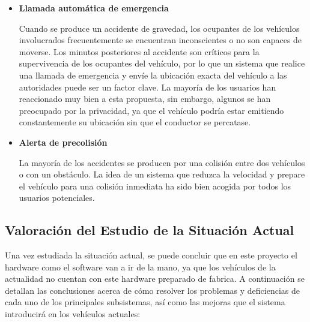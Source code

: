 \begin{itemize}[-]
\item \textbf{Llamada automática de emergencia}
\par Cuando se produce un accidente de gravedad, los ocupantes de los vehículos involucrados frecuentemente se encuentran inconscientes o no son capaces de moverse. Los minutos posteriores al accidente son críticos para la supervivencia de los ocupantes del vehículo, por lo que un sistema que realice una llamada de emergencia y envíe la ubicación exacta del vehículo a las autoridades puede ser un factor clave. La mayoría de los usuarios han reaccionado muy bien a esta propuesta, sin embargo, algunos se han preocupado por la privacidad, ya que el vehículo podría estar emitiendo constantemente su ubicación sin que el conductor se percatase.

\item \textbf{Alerta de precolisión}
\par La mayoría de los accidentes se producen por una colisión entre dos vehículos o con un obstáculo. La idea de un sistema que reduzca la velocidad y prepare el vehículo para una colisión inmediata ha sido bien acogida por todos los usuarios potenciales.


\end{itemize}

\subsection{Valoración del Estudio de la Situación Actual}
\par Una vez estudiada la situación actual, se puede concluir que en este proyecto el hardware como el software van a ir de la mano, ya que los vehículos de la actualidad no cuentan con este hardware preparado de fabrica. A continuación se detallan las conclusiones acerca de cómo resolver los problemas y deficiencias de cada uno de los principales subsistemas, así como las mejoras que el sistema introducirá en los vehículos actuales:

